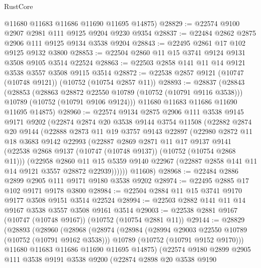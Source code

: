 \begin{lexlean}{RustCore}
\begin{coremodule}
      @11680
      @11683
      @11686
      @11690
      @11695
      @14875)
@28829 := @22574 @9100 @2907 @2981 @111 @9125 @9204 @9230 @9354
@28837 := @22484 @2862 @2875 @2906 @111 @9125 @9134 @3538 @9204
@28843 := @22495 @2861 @17 @102 @9125 @9132 @3800
@28853 := @22504 @2860 @11 @15 @3741 @9124 @9131 @3508 @9105 @3514 @22524
@28863 := @22503 @2858 @141 @11 @14 @9121 @3538 @3557 @3508 @9115 @3514
@28872 := @22538 @2857 @9121 (@10747 (@10748 @9121)) (@10752 (@10754 @2857 @11))
@28893 := @28837
    (@28843
      (@28853
        (@28863 @28872 @22550 @10789 (@10752 (@10791 @9116 @3538)))
        @10789
        (@10752 (@10791 @9106 @9124)))
      @11680
      @11683
      @11686
      @11690
      @11695
      @14875)
@28960 := @22574
    @9134
    @2875
    @2906
    @111
    @3538
    @9145
    @9171
    @9202
    (@22874
      @2874
      @20
      @3538
      @9144
      @3754
      @11508
      (@22882
        @2874
        @20
        @9144
        (@22888
          @2873
          @11
          @19
          @3757
          @9143
          @22897
          (@22980
            @2872
            @11
            @18
            @3683
            @9142
            @22993
            (@22887
              @2869
              @2871
              @11
              @17
              @9137
              @9141
              (@22538 @2868 @9137 (@10747 (@10748 @9137)) (@10752 (@10754 @2868 @11)))
              (@22958
                @2860
                @11
                @15
                @5359
                @9140
                @22967
                (@22887 @2858 @141 @11 @14 @9121 @3557 @28872 @22939))))))
      @11608)
@28968 := @22484 @2886 @2899 @2905 @111 @9171 @9180 @3538 @9202
@28974 := @22495 @2885 @17 @102 @9171 @9178 @3800
@28984 := @22504 @2884 @11 @15 @3741 @9170 @9177 @3508 @9151 @3514 @22524
@28994 := @22503 @2882 @141 @11 @14 @9167 @3538 @3557 @3508 @9161 @3514
@29003 := @22538 @2881 @9167 (@10747 (@10748 @9167)) (@10752 (@10754 @2881 @11))
@29144 := @28829
    (@28893
      (@28960
        (@28968
          (@28974
            (@28984
              (@28994 @29003 @22550 @10789 (@10752 (@10791 @9162 @3538)))
              @10789
              (@10752 (@10791 @9152 @9170)))
            @11680
            @11683
            @11686
            @11690
            @11695
            @14875)
          (@22574
            @9180
            @2899
            @2905
            @111
            @3538
            @9191
            @3538
            @9200
            (@22874
              @2898
              @20
              @3538
              @9190

\end{coremodule}
\end{lexlean}
